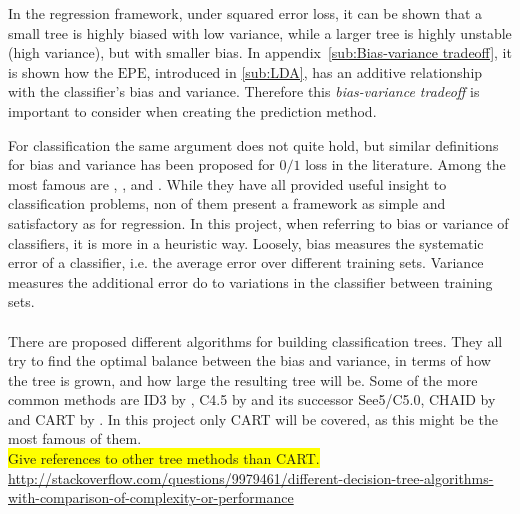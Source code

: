 In the regression framework, under squared error loss, it can be shown that a small tree is highly biased with low variance, while a larger tree is highly unstable (high variance), but with smaller bias. 
In appendix~\ref{sub:Bias-variance tradeoff}, it is shown how the $\mathrm{EPE}$, introduced in \ref{sub:LDA}, has an additive relationship with the classifier's bias and variance. Therefore this \textit{bias-variance tradeoff} is important to consider when creating the prediction method. 

For classification the same argument does not quite hold, but similar definitions for bias and variance has been proposed for $0/1$ loss in the literature. Among the most famous are \cite{kong1995error}, \cite{kohavi1996bias}, \cite{breiman1996bias} and \cite{Friedman1997bias}. While they have all provided useful insight to classification problems, non of them present a framework as simple and satisfactory as for regression. In this project, when referring to bias or variance of classifiers, it is more in a heuristic way. Loosely, bias measures the systematic error of a classifier, i.e. the average error over different training sets. Variance measures the additional error do to variations in the classifier between training sets. 
\\
\\
There are proposed different algorithms for building classification trees. They all try to find the optimal balance between the bias and variance, in terms of how the tree is grown, and how large the resulting tree will be.
Some of the more common methods are ID3 by \cite{ID3}, C4.5 by \cite{C4.5} and its successor See5/C5.0, CHAID by \cite{CHAID} and CART by \cite{breiman}.
In this project only CART will be covered, as this might be the most famous of them.
\\ \colorbox{yellow}{Give references to other tree methods than CART.}
\\\url{http://stackoverflow.com/questions/9979461/different-decision-tree-algorithms-with-comparison-of-complexity-or-performance}
%
